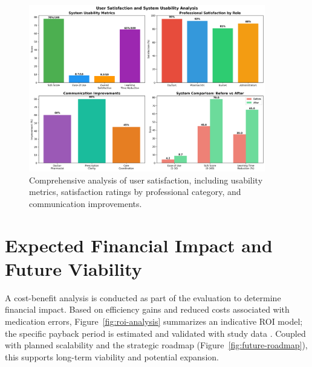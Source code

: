 \begin{figure}[htbp]
    \centering
    \includegraphics[width=0.92\textwidth]{images/generated/user_satisfaction.png}
    \caption{Comprehensive analysis of user satisfaction, including usability metrics, satisfaction ratings by professional category, and communication improvements.}
    \label{fig:user-satisfaction}
\end{figure}

\section{Expected Financial Impact and Future Viability}

A cost-benefit analysis is conducted as part of the evaluation to determine financial impact. Based on efficiency gains and reduced costs associated with medication errors, Figure~\ref{fig:roi-analysis} summarizes an indicative ROI model; the specific payback period is estimated and validated with study data \cite{adler2021}. Coupled with planned scalability and the strategic roadmap (Figure~\ref{fig:future-roadmap}), this supports long-term viability and potential expansion.

